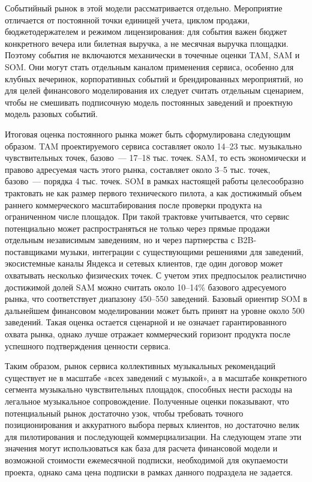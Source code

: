 Событийный рынок в этой модели рассматривается отдельно. Мероприятие отличается от постоянной точки единицей учета, циклом продажи, бюджетодержателем и режимом лицензирования: для события важен бюджет конкретного вечера или билетная выручка, а не месячная выручка площадки. Поэтому события не включаются механически в точечные оценки TAM, SAM и SOM. Они могут стать отдельным каналом применения сервиса, особенно для клубных вечеринок, корпоративных событий и брендированных мероприятий, но для целей финансового моделирования их следует считать отдельным сценарием, чтобы не смешивать подписочную модель постоянных заведений и проектную модель разовых событий.

Итоговая оценка постоянного рынка может быть сформулирована следующим образом. TAM проектируемого сервиса составляет около 14--23 тыс. музыкально чувствительных точек, базово~--- 17--18 тыс. точек. SAM, то есть экономически и правово адресуемая часть этого рынка, составляет около 3--5 тыс. точек, базово~--- порядка 4 тыс. точек. SOM в рамках настоящей работы целесообразно трактовать не как размер первого технического пилота, а как достижимый объем раннего коммерческого масштабирования после проверки продукта на ограниченном числе площадок. При такой трактовке учитывается, что сервис потенциально может распространяться не только через прямые продажи отдельным независимым заведениям, но и через партнерства с B2B-поставщиками музыки, интеграции с существующими решениями для заведений, экосистемные каналы Яндекса и сетевых клиентов, где один договор может охватывать несколько физических точек. С учетом этих предпосылок реалистично достижимой долей SAM можно считать около 10--14\% базового адресуемого рынка, что соответствует диапазону 450--550 заведений. Базовый ориентир SOM в дальнейшем финансовом моделировании может быть принят на уровне около 500 заведений. Такая оценка остается сценарной и не означает гарантированного охвата рынка, однако лучше отражает коммерческий горизонт продукта после успешного подтверждения ценности сервиса.

Таким образом, рынок сервиса коллективных музыкальных рекомендаций существует не в масштабе «всех заведений с музыкой», а в масштабе конкретного сегмента музыкально чувствительных площадок, способных нести расходы на легальное музыкальное сопровождение. Полученные оценки показывают, что потенциальный рынок достаточно узок, чтобы требовать точного позиционирования и аккуратного выбора первых клиентов, но достаточно велик для пилотирования и последующей коммерциализации. На следующем этапе эти значения могут использоваться как база для расчета финансовой модели и возможной стоимости ежемесячной подписки, необходимой для окупаемости проекта, однако сама цена подписки в рамках данного подраздела не задается.

